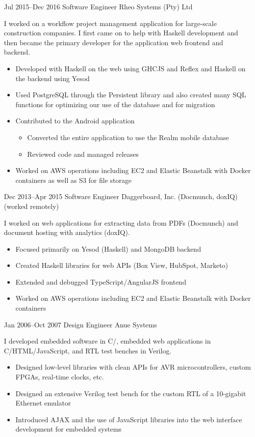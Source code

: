\documentclass[11pt,a4paper,roman]{moderncv}
\begin{document}
\cventry%
{Jul 2015--Dec 2016}%
{Software Engineer}%
{Rheo Systems (Pty) Ltd}%
{\pretoria}%
{}%
{I worked on a workflow project management application for large-scale construction companies. I first came on to help with Haskell development and then became the primary developer for the application web frontend and backend.
\begin{itemize}
\item Developed with Haskell on the web using GHCJS and Reflex and Haskell on the backend using Yesod
\item Used PostgreSQL through the Persistent library and also created many SQL functions for optimizing our use of the database and for migration
\item Contributed to the Android application
  \begin{itemize}
  \item Converted the entire application to use the Realm mobile database
  \item Reviewed code and managed releases
  \end{itemize}
\item Worked on AWS operations including EC2 and Elastic Beanstalk with Docker containers as well as S3 for file storage
\end{itemize}}

\cventry%
{Dec 2013--Apr 2015}%
{Software Engineer}%
{Daggerboard, Inc. (Docmunch, doxIQ)}%
{\sanfrancisco (worked remotely)}%
{}%
{I worked on web applications for extracting data from PDFs (Docmunch) and document hosting with analytics (doxIQ).
\begin{itemize}
\item Focused primarily on Yesod (Haskell) and MongoDB backend
\item Created Haskell libraries for web APIs (Box View, HubSpot, Marketo)
\item Extended and debugged TypeScript/AngularJS frontend
\item Worked on AWS operations including EC2 and Elastic Beanstalk with Docker containers
\end{itemize}}

\cventry%
{Jan 2006--Oct 2007}%
{Design Engineer}%
{Anue Systems}%
{\austin}%
{}%
{I developed embedded software in C/\Cpp, embedded web applications in C/HTML/JavaScript, and RTL test benches in Verilog.
\begin{itemize}
\item Designed low-level libraries with clean APIs for AVR microcontrollers, custom FPGAs, real-time clocks, etc.
\item Designed an extensive Verilog test bench for the custom RTL of a 10-gigabit Ethernet emulator
\item Introduced AJAX and the use of JavaScript libraries into the web interface development for embedded systems
\end{itemize}}
\end{document}
